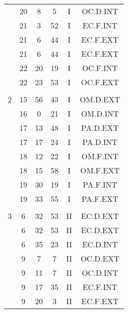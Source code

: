 \documentclass[12pt, a4paper]{article}
\begin{document}
\begin{multicols}{3}
{\begin{tabular}{c c c c c c}
	 	 	 	 & 20 & 8 & 5 & I & OC.D.INT\\%
	 	 	 	 & 21 & 3 & 52 & I & EC.F.INT\\%
	 	 	 	 & 21 & 6 & 44 & I & EC.F.EXT\\%
	 	 	 	 & 21 & 6 & 44 & I & EC.F.EXT\\%
	 	 	 	 & 22 & 20 & 19 & I & OC.F.INT\\%
	 	 	 	 & 22 & 23 & 53 & I & OC.F.EXT\\%
	 	 	 	 & & & & & \\%
	 	 	 	2 & 15 & 56 & 43 & I & OM.D.EXT\\%
	 	 	 	 & 16 & 0 & 21 & I & OM.D.INT\\%
	 	 	 	 & 17 & 13 & 48 & I & PA.D.EXT\\%
	 	 	 	 & 17 & 17 & 24 & I & PA.D.INT\\%
	 	 	 	 & 18 & 12 & 22 & I & OM.F.INT\\%
	 	 	 	 & 18 & 15 & 58 & I & OM.F.EXT\\%
	 	 	 	 & 19 & 30 & 19 & I & PA.F.INT\\%
	 	 	 	 & 19 & 33 & 55 & I & PA.F.EXT\\%
	 	 	 	 & & & & & \\%
	 	 	 	3 & 6 & 32 & 53 & II & EC.D.EXT\\%
	 	 	 	 & 6 & 32 & 53 & II & EC.D.EXT\\%
	 	 	 	 & 6 & 35 & 23 & II & EC.D.INT\\%
	 	 	 	 & 9 & 7 & 7 & II & OC.D.EXT\\%
	 	 	 	 & 9 & 11 & 7 & II & OC.D.INT\\%
	 	 	 	 & 9 & 17 & 35 & II & EC.F.INT\\%
	 	 	 	 & 9 & 20 & 3 & II & EC.F.EXT\\%

\end{tabular}}
\end{multicols}
\end{document}
